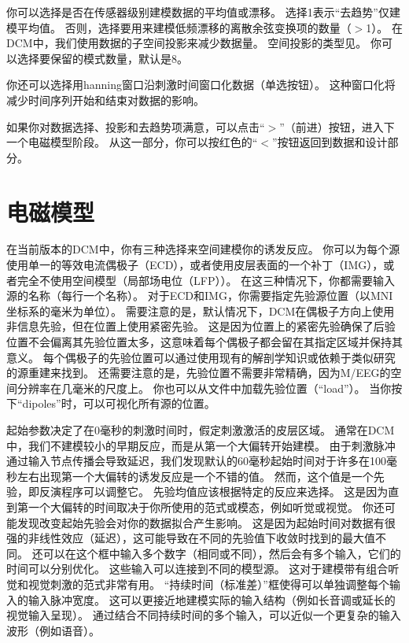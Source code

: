 你可以选择是否在传感器级别建模数据的平均值或漂移。
选择1表示“去趋势”仅建模平均值。
否则，选择要用来建模低频漂移的离散余弦变换项的数量（$>$1）。
在DCM中，我们使用数据的子空间投影来减少数据量。
空间投影的类型见\cite{u33}。
你可以选择要保留的模式数量，默认是8。

你还可以选择用hanning窗口沿刺激时间窗口化数据（单选按钮）。
这种窗口化将减少时间序列开始和结束对数据的影响。

如果你对数据选择、投影和去趋势项满意，可以点击“$>$”（前进）按钮，进入下一个电磁模型阶段。
从这一部分，你可以按红色的“$<$”按钮返回到数据和设计部分。


\section{电磁模型}

在当前版本的DCM中，你有三种选择来空间建模你的诱发反应。
你可以为每个源使用单一的等效电流偶极子（ECD），或者使用皮层表面的一个补丁（IMG），或者完全不使用空间模型（局部场电位（LFP））。
在这三种情况下，你都需要输入源的名称（每行一个名称）。
对于ECD和IMG，你需要指定先验源位置（以MNI坐标系的毫米为单位）。
需要注意的是，默认情况下，DCM在偶极子方向上使用非信息先验，但在位置上使用紧密先验。
这是因为位置上的紧密先验确保了后验位置不会偏离其先验位置太多，这意味着每个偶极子都会留在其指定区域并保持其意义。
每个偶极子的先验位置可以通过使用现有的解剖学知识或依赖于类似研究的源重建来找到。
还需要注意的是，先验位置不需要非常精确，因为M/EEG的空间分辨率在几毫米的尺度上。
你也可以从文件中加载先验位置（“load”）。
当你按下“dipoles”时，可以可视化所有源的位置。

起始参数决定了在0毫秒的刺激时间时，假定刺激激活的皮层区域。
通常在DCM中，我们不建模较小的早期反应，而是从第一个大偏转开始建模。
由于刺激脉冲通过输入节点传播会导致延迟，我们发现默认的60毫秒起始时间对于许多在100毫秒左右出现第一个大偏转的诱发反应是一个不错的值。
然而，这个值是一个先验，即反演程序可以调整它。
先验均值应该根据特定的反应来选择。
这是因为直到第一个大偏转的时间取决于你所使用的范式或模态，例如听觉或视觉。
你还可能发现改变起始先验会对你的数据拟合产生影响。
这是因为起始时间对数据有很强的非线性效应（延迟），这可能导致在不同的先验值下收敛时找到的最大值不同。
还可以在这个框中输入多个数字（相同或不同），然后会有多个输入，它们的时间可以分别优化。
这些输入可以连接到不同的模型源。
这对于建模带有组合听觉和视觉刺激的范式非常有用。
“持续时间（标准差）”框使得可以单独调整每个输入的输入脉冲宽度。
这可以更接近地建模实际的输入结构（例如长音调或延长的视觉输入呈现）。
通过结合不同持续时间的多个输入，可以近似一个更复杂的输入波形（例如语音）。


